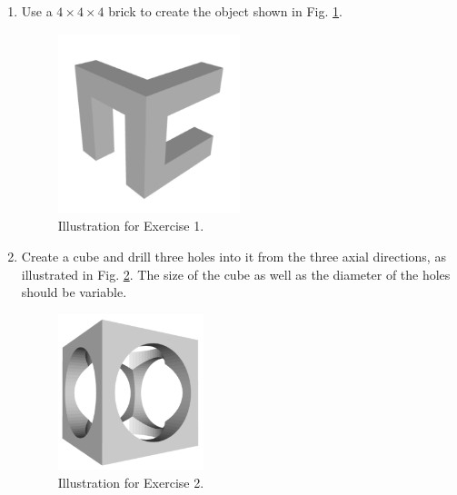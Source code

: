 \documentclass{article}
\begin{document}
\begin{enumerate}

\item Use a $4 \times 4 \times 4$ brick to create the object shown in 
Fig. \ref{fig:nclabicon}.

\newpage

\begin{figure}[!ht]
\begin{center}
\includegraphics[width=0.5\textwidth]{img/nclabicon.png}
\end{center}
\vspace{-2mm}
\caption{Illustration for Exercise 1.}
\label{fig:nclabicon}
\end{figure}
\noindent

\item Create a cube and drill three holes into it from the three axial 
directions, as illustrated in Fig. \ref{fig:drilledcube}.
The size of the cube as well as the diameter of the holes should 
be variable. 


\begin{figure}[!ht]
\begin{center}
\includegraphics[width=0.4\textwidth]{img/drilledcube.png}
\end{center}
\vspace{-2mm}
\caption{Illustration for Exercise 2.}
\label{fig:drilledcube}
\end{figure}


\end{enumerate}
\end{document}
